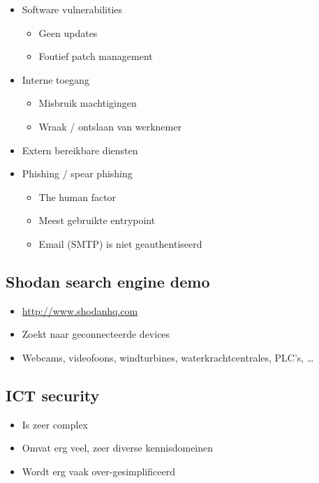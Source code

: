 \documentclass{article}
\begin{document}
\begin{itemize}
    \item Software vulnerabilities
    \begin{itemize}
        \item Geen updates
        \item Foutief patch management
    \end{itemize}
    \item Interne toegang
    \begin{itemize}
        \item Misbruik machtigingen
        \item Wraak / ontslaan van werknemer
    \end{itemize}
    \item Extern bereikbare diensten
    \item Phishing / spear phishing
    \begin{itemize}
        \item The human factor
        \item Meest gebruikte entrypoint
        \item Email (SMTP) is niet geauthentiseerd
    \end{itemize}
\end{itemize}

\subsection{Shodan search engine demo}

\begin{itemize}
    \item \url{http://www.shodanhq.com}
    \item Zoekt naar geconnecteerde devices
    \item Webcams, videofoons, windturbines, waterkrachtcentrales, PLC's, \dots
\end{itemize}


\subsection{ICT security}
\begin{itemize}
    \item Is zeer complex
    \item Omvat erg veel, zeer diverse kennisdomeinen
    \item Wordt erg vaak over-gesimplificeerd
\end{itemize}
\end{document}
